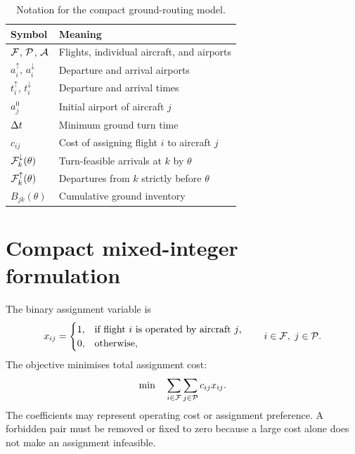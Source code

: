 \begin{table}[t]
    \centering
    \small
    \caption{Notation for the compact ground-routing model.}
    \label{tab:ground_notation}
    \begin{tabular}{ll}
        \toprule
        Symbol & Meaning \\
        \midrule
        $\mathcal{F}$, $\mathcal{P}$, $\mathcal{A}$ & Flights, individual aircraft, and airports \\
        $a_i^{\uparrow}$, $a_i^{\downarrow}$ & Departure and arrival airports \\
        $t_i^{\uparrow}$, $t_i^{\downarrow}$ & Departure and arrival times \\
        $a_j^0$ & Initial airport of aircraft $j$ \\
        $\Delta t$ & Minimum ground turn time \\
        $c_{ij}$ & Cost of assigning flight $i$ to aircraft $j$ \\
        $\mathcal{F}_k^{\downarrow}(\theta)$ & Turn-feasible arrivals at $k$ by $\theta$ \\
        $\mathcal{F}_k^{\uparrow}(\theta)$ & Departures from $k$ strictly before $\theta$ \\
        $B_{jk}(\theta)$ & Cumulative ground inventory \\
        \bottomrule
    \end{tabular}
\end{table}

\section{Compact mixed-integer formulation}

The binary assignment variable is
\begin{equation}
    x_{ij}=
    \begin{cases}
        1, & \text{if flight $i$ is operated by aircraft $j$,}\\
        0, & \text{otherwise,}
    \end{cases}
    \qquad i\in\mathcal{F},\;j\in\mathcal{P}.
    \label{eq:ground_assignment_variable}
\end{equation}
The objective minimises total assignment cost:
\begin{equation}
    \min\quad\sum_{i\in\mathcal{F}}\sum_{j\in\mathcal{P}}c_{ij}x_{ij}.
    \label{eq:ground_objective}
\end{equation}
The coefficients may represent operating cost or assignment preference. A
forbidden pair must be removed or fixed to zero because a large cost alone does
not make an assignment infeasible.

